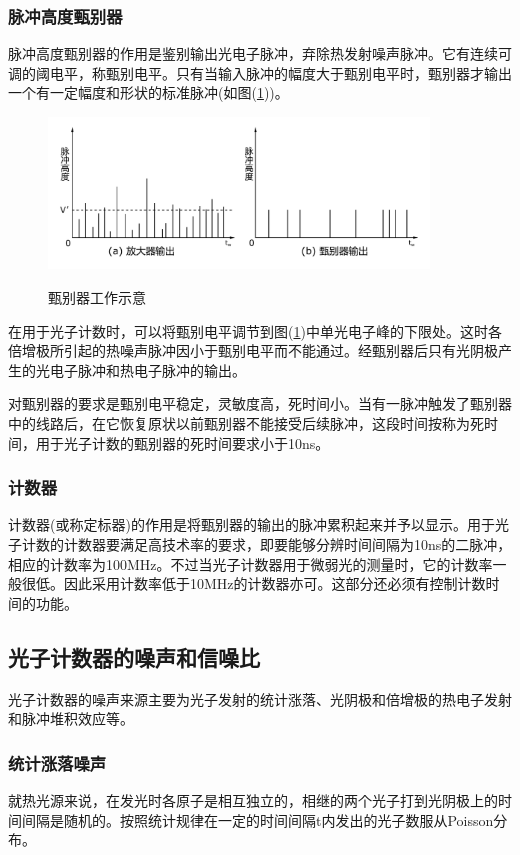 \documentclass[a4paper]{article}
\begin{document}
\subsubsection{脉冲高度甄别器}
脉冲高度甄别器的作用是鉴别输出光电子脉冲，弃除热发射噪声脉冲。它有连续可调的阈电平，称甄别电平。只有当输入脉冲的幅度大于甄别电平时，甄别器才输出一个有一定幅度和形状的标准脉冲(如图(\ref{fig6}))。
\begin{figure}[!h]
\centering
\includegraphics[width=0.9\textwidth]{fig/fig6.pdf}\\
\caption{甄别器工作示意}\label{fig6}
\end{figure}
在用于光子计数时，可以将甄别电平调节到图(\ref{fig6})中单光电子峰的下限处。这时各倍增极所引起的热噪声脉冲因小于甄别电平而不能通过。经甄别器后只有光阴极产生的光电子脉冲和热电子脉冲的输出。

对甄别器的要求是甄别电平稳定，灵敏度高，死时间小。当有一脉冲触发了甄别器中的线路后，在它恢复原状以前甄别器不能接受后续脉冲，这段时间按称为死时间，用于光子计数的甄别器的死时间要求小于10ns。
\subsubsection{计数器}
计数器(或称定标器)的作用是将甄别器的输出的脉冲累积起来并予以显示。用于光子计数的计数器要满足高技术率的要求，即要能够分辨时间间隔为10ns的二脉冲，相应的计数率为100MHz。不过当光子计数器用于微弱光的测量时，它的计数率一般很低。因此采用计数率低于10MHz的计数器亦可。这部分还必须有控制计数时间的功能。
\subsection{光子计数器的噪声和信噪比}
光子计数器的噪声来源主要为光子发射的统计涨落、光阴极和倍增极的热电子发射和脉冲堆积效应等。
\subsubsection{统计涨落噪声}
就热光源来说，在发光时各原子是相互独立的，相继的两个光子打到光阴极上的时间间隔是随机的。按照统计规律在一定的时间间隔t内发出的光子数服从Poisson分布。
\end{document}
